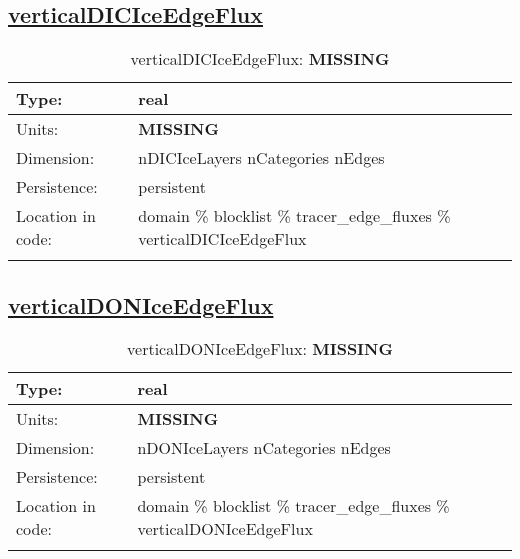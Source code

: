 \subsection[verticalDICIceEdgeFlux]{\hyperref[sec:var_tab_tracer_edge_fluxes]{verticalDICIceEdgeFlux}}
\label{subsec:var_sec_tracer_edge_fluxes_verticalDICIceEdgeFlux}
\begin{center}
\begin{longtable}{| p{2.0in} | p{4.0in} |}
        \hline 
        Type: & real \\
        \hline 
        Units: & {\bf \color{red} MISSING} \\
        \hline 
        Dimension: & nDICIceLayers nCategories nEdges \\
        \hline 
        Persistence: & persistent \\
        \hline 
         Location in code: & domain \% blocklist \% tracer\_edge\_fluxes \% verticalDICIceEdgeFlux \\
         \hline 
    \caption{verticalDICIceEdgeFlux: {\bf \color{red} MISSING}}
\end{longtable}
\end{center}
\subsection[verticalDONIceEdgeFlux]{\hyperref[sec:var_tab_tracer_edge_fluxes]{verticalDONIceEdgeFlux}}
\label{subsec:var_sec_tracer_edge_fluxes_verticalDONIceEdgeFlux}
\begin{center}
\begin{longtable}{| p{2.0in} | p{4.0in} |}
        \hline 
        Type: & real \\
        \hline 
        Units: & {\bf \color{red} MISSING} \\
        \hline 
        Dimension: & nDONIceLayers nCategories nEdges \\
        \hline 
        Persistence: & persistent \\
        \hline 
         Location in code: & domain \% blocklist \% tracer\_edge\_fluxes \% verticalDONIceEdgeFlux \\
         \hline 
    \caption{verticalDONIceEdgeFlux: {\bf \color{red} MISSING}}
\end{longtable}
\end{center}
